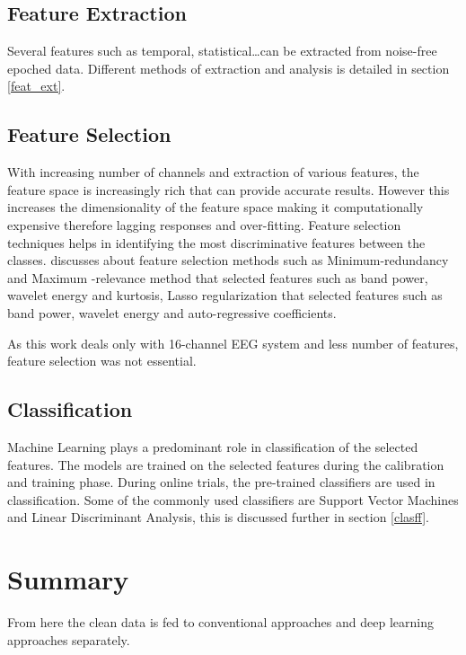 \subsection{Feature Extraction}
Several features such as temporal, statistical\dots can be extracted from noise-free epoched data. Different methods of extraction and analysis is detailed in section \ref{feat_ext}.

\subsection{Feature Selection}
With increasing number of channels and extraction of various features, the feature space is increasingly rich that can provide accurate results. However this increases the dimensionality of the feature space making it computationally expensive therefore lagging responses and over-fitting. Feature selection techniques helps in identifying the most discriminative features between the classes. \cite{2017_MI_ML_SP} discusses about feature selection methods such as Minimum-redundancy and Maximum -relevance method that selected features such as band power, wavelet energy and kurtosis, Lasso regularization that selected features such as band power, wavelet energy and auto-regressive coefficients.

As this work deals only with 16-channel EEG system and less number of features, feature selection was not essential.

\subsection{Classification}
Machine Learning plays a predominant role in classification of the selected features. The models are trained on the selected features during the calibration and training phase. During online trials, the pre-trained classifiers are used in classification. Some of the commonly used classifiers are Support Vector Machines and Linear Discriminant Analysis, this is discussed further in section \ref{clasff}.

\section*{Summary}
From here the clean data is fed to conventional approaches and deep learning approaches separately.